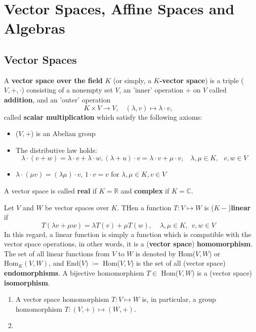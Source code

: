 \chapter{Vector Spaces, Affine Spaces and Algebras}


\section{Vector Spaces}

\begin{definition}\label{def: vec_space}
    A \textbf{vector space over the field} \(K\) (or simply, a \(K\)\textbf{-vector space})
    is a triple (\(V, +, \cdot\)) consisting of a nonempty set \(V\), an 'inner' operation
    + on \(V\) called \textbf{addition}, and an 'outer' operation 
    \[
        K \times V \rightarrow V, \:\:\:\: (\lambda, v) \mapsto \lambda \cdot v,
    \]
    called \textbf{scalar multiplication} which satisfy the following axioms:
    \begin{itemize}
        \item (\(V, +\)) is an Abelian group 
        \item The distributive law holds:
        \[
            \lambda \cdot (v + w) = \lambda \cdot v + \lambda \cdot w, (\lambda + u) 
            \cdot v = \lambda \cdot v + \mu \cdot v, \:\:\:\: \lambda, \mu \in K, \:\:\: v, w \in V
        \]
        \item \(\lambda \cdot \left(\mu v\right) = \left(\lambda \mu\right) \cdot v\), \(1 \cdot v = v\)
        for \(\lambda, \mu \in K, v \in V\)
    \end{itemize}
    A vector space is called \textbf{real} if \(K = \mathbb{R}\) and \textbf{complex} if \(K = \mathbb{C}\).
\end{definition}


\begin{note}
    Let \(V\) and \(W\) be vector spaces over \(K\). THen a function \(T \colon V \mapsto W\)
    is (\(K-\))\textbf{linear} if 
    \[
        T(\lambda v + \mu w) = \lambda T(v) + \mu T(w), \:\:\:\:\: \lambda, \mu \in K, \:\: v, w \in V
    \]
    In this regard, a linear function is simply a function which is compatible with the vector
    space operations, in other words, it is a (\textbf{vector space}) \textbf{homomorphism}.
    The set of all linear functions from \(V\) to \(W\) is denoted by Hom(\(V, W\)) or
    \(\text{Hom}_K\left(V, W\right)\), and End(\(V\)) \(\coloneqq\) Hom(\(V,V\)) is the set of
    all (vector space) \textbf{endomorphisms}. A bijective homomorphism \(T \in \) Hom(\(V, W\))
    is a (vector space) \textbf{isomorphism}.  
\end{note}

\begin{remark}
    \begin{enumerate}[label = (\alph*)]
        \item A vector space homomorphism \(T \colon V \mapsto W\) is, in particular, 
        a group homomorphism \(T \colon \left(V, +\right) \mapsto \left(W, +\right)\). 
        \item 
    \end{enumerate}
\end{remark}
